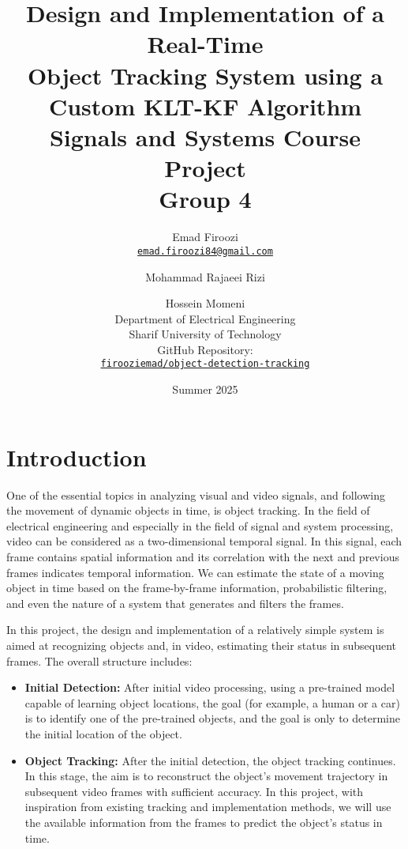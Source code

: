 \documentclass[12pt, a4paper]{article}
\title{
    \vspace{2cm}
    \textbf{Design and Implementation of a Real-Time \\ Object Tracking System using a Custom KLT-KF Algorithm}
    \vspace{1.5cm}
    \large{Signals and Systems Course Project \\ Group 4}
    \vspace{2cm}
}
\author{
    Emad Firoozi \\
    \href{mailto:emad.firoozi84@gmail.com}{\texttt{emad.firoozi84@gmail.com}}
    \and
    Mohammad Rajaeei Rizi
    \and
    Hossein Momeni
    \vspace{1cm}
    \\
    \large{Department of Electrical Engineering} \\
    \large{Sharif University of Technology} \\
    \vspace{0.5cm}
    \large{GitHub Repository:} \\
    \href{https://github.com/firooziemad/object-detection-tracking}{\lstinline!firooziemad/object-detection-tracking!}
}
\date{Summer 2025}
\begin{document}
\maketitle
\thispagestyle{empty}

\newpage

\tableofcontents

\newpage


\section{Introduction}

One of the essential topics in analyzing visual and video signals, and following the movement of dynamic objects in time, is object tracking. In the field of electrical engineering and especially in the field of signal and system processing, video can be considered as a two-dimensional temporal signal. In this signal, each frame contains spatial information and its correlation with the next and previous frames indicates temporal information. We can estimate the state of a moving object in time based on the frame-by-frame information, probabilistic filtering, and even the nature of a system that generates and filters the frames.

In this project, the design and implementation of a relatively simple system is aimed at recognizing objects and, in video, estimating their status in subsequent frames. The overall structure includes:

\begin{itemize}
    \item \textbf{Initial Detection:} After initial video processing, using a pre-trained model capable of learning object locations, the goal (for example, a human or a car) is to identify one of the pre-trained objects, and the goal is only to determine the initial location of the object.
    
    \item \textbf{Object Tracking:} After the initial detection, the object tracking continues. In this stage, the aim is to reconstruct the object's movement trajectory in subsequent video frames with sufficient accuracy. In this project, with inspiration from existing tracking and implementation methods, we will use the available information from the frames to predict the object's status in time.
\end{itemize}
\end{document}
